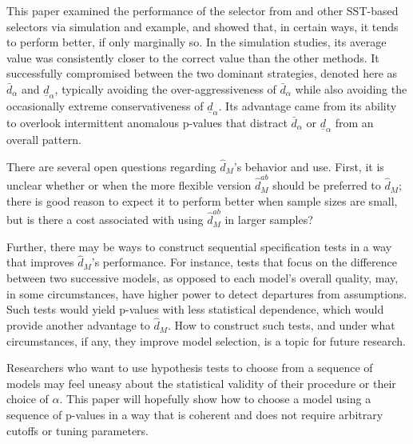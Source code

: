 \documentclass[lineno]{biometrika}\usepackage[]{graphicx}\usepackage[]{color}
\newcommand{\dalphaU}{\bar{d}_\alpha}
\newcommand{\dalphaB}{\underline{d}_\alpha}
\newcommand{\dhatm}{\hat{d}_M}
\newcommand{\dhatmab}{\hat{d}^{ab}_M}
\begin{document}
This paper examined the performance of the selector from
\citet{mallik} and other SST-based selectors via simulation and
example, and showed that, in certain ways, it tends to perform better,
if only marginally so.
In the simulation studies, its average value was consistently closer
to the correct value than the other methods.
It successfully compromised between the two dominant strategies,
denoted here as $\dalphaU$ and $\dalphaB$, typically avoiding the
over-aggressiveness of $\dalphaU$ while also avoiding the
occasionally extreme conservativeness of $\dalphaB$.
Its advantage came from its ability to overlook intermittent anomalous
p-values that distract $\dalphaU$ or $\dalphaB$ from an overall
pattern.

There are several open questions regarding $\dhatm$'s behavior and
use.
First, it is unclear whether or when the more flexible version
$\dhatmab$ should be preferred to $\dhatm$; there is good reason to
expect it to perform better when sample sizes are small, but is there
a cost associated with using $\dhatmab$ in larger samples?

Further, there may be ways to construct sequential specification tests in a way that improves
$\dhatm$'s performance.
For instance, tests that focus on the difference between two
successive models, as opposed to each model's overall quality, may, in
some circumstances, have higher power to detect departures from
assumptions.
Such tests would yield p-values with less statistical dependence,
which would provide another advantage to $\dhatm$.
How to construct such tests, and under what circumstances, if any,
they improve model selection, is a topic for future research.

Researchers who want to use hypothesis tests to choose from a sequence
of models may feel uneasy about the statistical validity of their
procedure or their choice of $\alpha$.
This paper will hopefully show how to choose a model using a sequence
of p-values in a way that is coherent and does not require arbitrary
cutoffs or tuning parameters.





\end{document}
